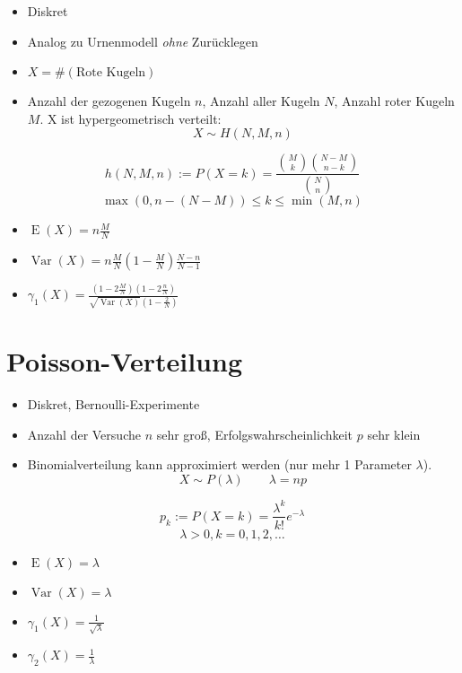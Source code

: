 \documentclass[a4paper,twocolumn]{article}
\DeclareMathOperator{\Var}{Var}
\DeclareMathOperator{\E}{E}
\begin{document}
\begin{itemize}
  \item Diskret
  \item Analog zu Urnenmodell \emph{ohne} Zurücklegen
  \item $X = \#(\text{Rote Kugeln})$
  \item Anzahl der gezogenen Kugeln $n$,
        Anzahl aller Kugeln $N$,
        Anzahl roter Kugeln $M$.
        X ist hypergeometrisch verteilt:
        \[
            X \sim H(N,M,n)
        \]
\end{itemize}

\[
    h(N,M,n) := P(X=k) = \frac{{M \choose k} {N-M \choose n-k}}
        {{N\choose n}}
\] \[
    \max(0,n-(N-M))\leq k\leq \min(M,n)
\]

\begin{itemize}
  \item $\E(X) = n\frac{M}{N}$
  \item $\Var(X) = n\frac{M}{N} \left(1 - \frac{M}{N}\right)
                    \frac{N-n}{N-1}$
  \item $\gamma_1(X) = \frac{(1 - 2\frac{M}{N})(1 - 2\frac{n}{N})}
                            {\sqrt{\Var(X)}(1 - \frac2{N})}$
\end{itemize}

\section{Poisson-Verteilung}

\begin{itemize}
  \item Diskret, Bernoulli-Experimente
  \item Anzahl der Versuche $n$ sehr groß,
        Erfolgswahrscheinlichkeit $p$ sehr klein
  \item Binomialverteilung kann approximiert werden
        (nur mehr 1 Parameter $\lambda$).
        \[
            X \sim P(\lambda)
                \qquad \lambda = np
        \]
\end{itemize}

\[
    p_k := P(X = k) = \frac{\lambda^k}{k!} e^{-\lambda}
\] \[
    \lambda > 0, k = 0,1,2,\ldots
\]

\begin{itemize}
  \item $\E(X) = \lambda$
  \item $\Var(X) = \lambda$
  \item $\gamma_1(X) = \frac{1}{\sqrt{\lambda}}$
  \item $\gamma_2(X) = \frac{1}{\lambda}$
\end{itemize}
\end{document}
